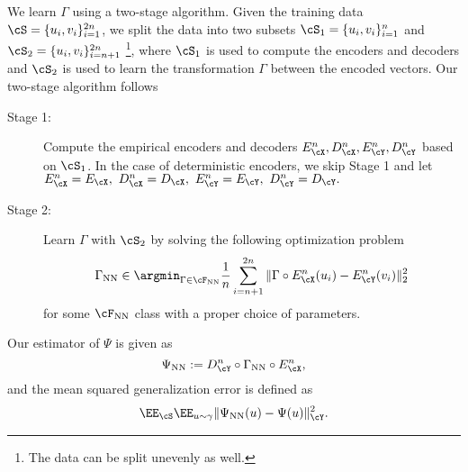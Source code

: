 \documentclass[11pt]{article} %
\begin{document}
We learn $\Gamma$ using a two-stage algorithm. Given the training data $\cS=\{u_i,v_i\}_{i=1}^{2n}$, %
 we split the data into two subsets $\cS_1=\{u_i,v_i\}_{i=1}^{n}$ and $\cS_2=\{u_i,v_i\}_{i=n+1}^{2n}$ \footnote{The data can be  split unevenly as well.}, where $\cS_1$ is used to compute the encoders and decoders and $\cS_2$ is used to learn the transformation $\Gamma$ between the encoded vectors.
Our two-stage algorithm follows
\begin{description}
	\item[Stage 1:] Compute the empirical encoders and decoders $E_{\cX}^n, D_{\cX}^n, E_{\cY}^n, D_{\cY}^n$ based on $\cS_1$. In the case of deterministic encoders, we skip Stage 1 and let $
E_{\cX}^n=E_{\cX}, \ D_{\cX}^n=D_{\cX}, \ E_{\cY}^n=E_{\cY}, \ D_{\cY}^n=D_{\cY}.
$
	
	
	\item[Stage 2:] Learn $\Gamma$ with $\cS_2$ by solving the following optimization problem
	\begin{align}
		\Gamma_{\rm NN}\in \argmin_{\Gamma\in \cF_{\rm NN}} \frac{1}{n}\sum_{i=n+1}^{2n}\| \Gamma\circ E_{\cX}^n(u_i) -E_{\cY}^n(v_i)\|_2^2
		\label{eq.PsiNN}
	\end{align}
for some $\cF_{\rm NN}$ class with a proper choice of parameters.
\end{description}
Our estimator of $\Psi$ is given as
$$\Psi_{\rm NN} :=
D_{\cY}^n\circ \Gamma_{\rm NN} \circ E_{\cX}^n,
$$
and the mean squared generalization error is defined as
\begin{align}
		\EE_{\cS}\EE_{u\sim \gamma}\| \Psi_{\rm NN}(u)- \Psi(u)\|_{\cY}^2.
		\label{eq.error}
\end{align}
\end{document}
